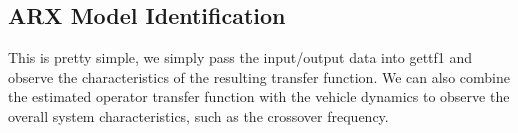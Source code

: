 \subsection{ARX Model Identification}


This is pretty simple, we simply pass the input/output data into gettf1 and observe the characteristics of the resulting transfer function.
We can also combine the estimated operator transfer function with the vehicle dynamics to observe the overall system characteristics, such as the crossover frequency.

